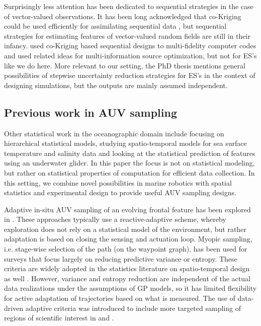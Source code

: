\documentclass[aoas]{imsart}
\begin{document}
Surprisingly less attention has been dedicated to sequential
strategies in the case of vector-valued observations. It has been long
acknowledged that co-Kriging could be used efficiently for
assimilating sequential data \citep{Vargas-Guzman1999}, but sequential
strategies for estimating features of vector-valued random fields are
still in their infancy. \cite{LeGratiet.etal2015} used co-Kriging
based sequential designs to multi-fidelity computer codes and
\cite{Poloczek2017} used related ideas for multi-information source
optimization, but not for ES's like we do here. More relevant to our
setting, the PhD thesis \citep[][p.82]{stroh} mentions general
possibilities of stepwise uncertainty reduction strategies for ES's in
the context of designing simulations, but the outputs are mainly
assumed independent.


\subsection{Previous work in AUV sampling}

Other statistical work in the oceanographic domain include
\cite{wikle2013modern} focusing on hierarchical statistical models,
\cite{sahu2008space} studying spatio-temporal models for sea surface
temperature and salinity data and \cite{mellucci2018oceanic} looking
at the statistical prediction of features using an underwater glider.
In this paper the focus is not on statistical modeling, but rather on
statistical properties of computation for efficient data
collection. In this setting, we combine novel possibilities in marine
robotics with spatial statistics and experimental design to provide
useful AUV sampling designs.

Adaptive in-situ AUV sampling of an evolving frontal feature has been
explored in \cite{fronts11,Smith2016,Pinto2018,costa19}. These
approaches typically use a reactive-adaptive scheme, whereby
exploration does not rely on a statistical model of the environment,
but rather adaptation is based on closing the sensing and actuation
loop. Myopic sampling, i.e. stage-wise selection of the path (on the
waypoint graph), has been used for surveys
\citep{singh2009efficient,Binney2013} that focus largely on reducing
predictive variance or entropy. These criteria are widely adopted in
the statistics literature on spatio-temporal design as well
\citep{bueso1998state,zidek2019monitoring}. However, variance and
entropy reduction are independent of the actual data realizations
under the assumptions of GP models, so it has limited flexibility for
active adaptation of trajectories based on what is measured.  The use
of data-driven adaptive criteria was introduced to include more
targeted sampling of regions of scientific interest in \cite{Low2009}
and \cite{fossuminformation}.
\end{document}
